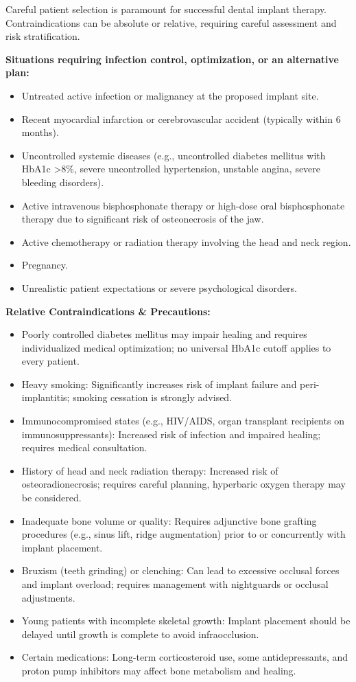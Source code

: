 Careful patient selection is paramount for successful dental implant therapy. Contraindications can be absolute or relative, requiring careful assessment and risk stratification.

\textbf{Situations requiring infection control, optimization, or an alternative plan:}
\begin{itemize}
  \item Untreated active infection or malignancy at the proposed implant site.
  \item Recent myocardial infarction or cerebrovascular accident (typically within 6 months).
  \item Uncontrolled systemic diseases (e.g., uncontrolled diabetes mellitus with HbA1c >8\%, severe uncontrolled hypertension, unstable angina, severe bleeding disorders).
  \item Active intravenous bisphosphonate therapy or high-dose oral bisphosphonate therapy due to significant risk of osteonecrosis of the jaw.
  \item Active chemotherapy or radiation therapy involving the head and neck region.
  \item Pregnancy.
  \item Unrealistic patient expectations or severe psychological disorders.
\end{itemize}

\textbf{Relative Contraindications \& Precautions:}
\begin{itemize}
  \item Poorly controlled diabetes mellitus may impair healing and requires individualized medical optimization; no universal HbA1c cutoff applies to every patient.
  \item Heavy smoking: Significantly increases risk of implant failure and peri-implantitis; smoking cessation is strongly advised.
  \item Immunocompromised states (e.g., HIV/AIDS, organ transplant recipients on immunosuppressants): Increased risk of infection and impaired healing; requires medical consultation.
  \item History of head and neck radiation therapy: Increased risk of osteoradionecrosis; requires careful planning, hyperbaric oxygen therapy may be considered.
  \item Inadequate bone volume or quality: Requires adjunctive bone grafting procedures (e.g., sinus lift, ridge augmentation) prior to or concurrently with implant placement.
  \item Bruxism (teeth grinding) or clenching: Can lead to excessive occlusal forces and implant overload; requires management with nightguards or occlusal adjustments.
  \item Young patients with incomplete skeletal growth: Implant placement should be delayed until growth is complete to avoid infraocclusion.
  \item Certain medications: Long-term corticosteroid use, some antidepressants, and proton pump inhibitors may affect bone metabolism and healing.
\end{itemize}

